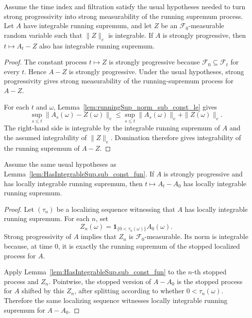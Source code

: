 \begin{lemma}
  \label{lem:HasIntegrableSup.sub_const_fun}
Assume the time index and filtration satisfy the usual hypotheses needed
to turn strong progressivity into strong measurability of the running
supremum process.  Let \(A\) have integrable running supremum, and let
\(Z\) be an \(\mathcal F_0\)-measurable random variable such that
\(\|Z\|_e\) is integrable.  If \(A\) is strongly progressive, then
\(t\mapsto A_t-Z\) also has integrable running supremum.
\end{lemma}

\begin{proof}

\leanok
The constant process \(t\mapsto Z\) is strongly progressive because
\(\mathcal F_0\subseteq\mathcal F_t\) for every \(t\).  Hence
\(A-Z\) is strongly progressive.  Under the usual hypotheses, strong
progressivity gives strong measurability of the running-supremum process
for \(A-Z\).

For each \(t\) and \(\omega\), Lemma~\ref{lem:runningSup_norm_sub_const_le}
gives
\[
  \sup_{s\le t}\|A_s(\omega)-Z(\omega)\|_e
  \le
  \sup_{s\le t}\|A_s(\omega)\|_e+\|Z(\omega)\|_e .
\]
The right-hand side is integrable by the integrable running supremum of
\(A\) and the assumed integrability of \(\|Z\|_e\).  Domination therefore
gives integrability of the running supremum of \(A-Z\).
\end{proof}

\begin{lemma}
  \label{lem:HasLocallyIntegrableSup.sub_initial}
Assume the same usual hypotheses as
Lemma~\ref{lem:HasIntegrableSup.sub_const_fun}.  If \(A\) is strongly
progressive and has locally integrable running supremum, then
\(t\mapsto A_t-A_0\) has locally integrable running supremum.
\end{lemma}

\begin{proof}

\leanok
Let \((\tau_n)\) be a localizing sequence witnessing that \(A\) has locally
integrable running supremum.  For each \(n\), set
\[
  Z_n(\omega)=\mathbf 1_{\{0<\tau_n(\omega)\}} A_0(\omega).
\]
Strong progressivity of \(A\) implies that \(Z_n\) is
\(\mathcal F_0\)-measurable.  Its norm is integrable because, at time
\(0\), it is exactly the running supremum of the stopped localized process
for \(A\).

Apply Lemma~\ref{lem:HasIntegrableSup.sub_const_fun} to the \(n\)-th
stopped process and \(Z_n\).  Pointwise, the stopped version of
\(A-A_0\) is the stopped process for \(A\) shifted by this \(Z_n\), after
splitting according to whether \(0<\tau_n(\omega)\).  Therefore the same
localizing sequence witnesses locally integrable running supremum for
\(A-A_0\).
\end{proof}


